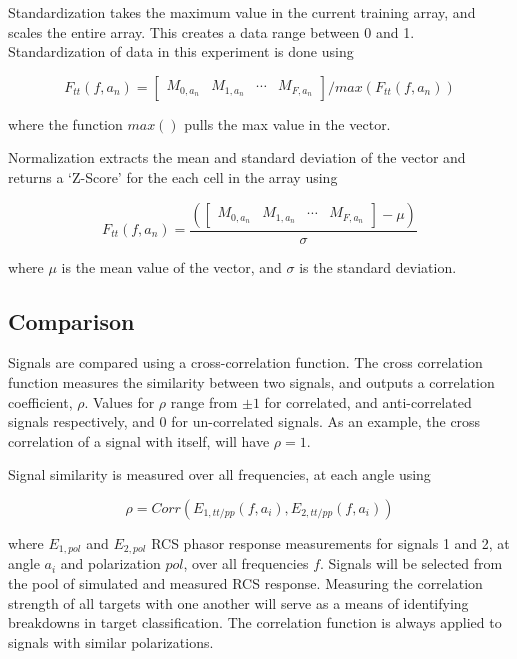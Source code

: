     Standardization takes the maximum value in the current training array, and scales the entire array. This creates a data range between 0 and 1. Standardization of data in this experiment is done using

    \begin{equation}\label{eq:F_stan}
      F_{tt}(f, a_n) =
       \begin{bmatrix}
         M_{0, a_n} & M_{1,a_n} & \cdots & M_{F,a_n}
       \end{bmatrix} / max(F_{tt}(f, a_n))
    \end{equation}

    where the function $max()$ pulls the max value in the vector.

    Normalization extracts the mean and standard deviation of the vector and returns a `Z-Score' for the each cell in the array using

    \begin{equation}\label{eq:F_z}
      F_{tt}(f, a_n) =
       \frac{\left(
       \begin{bmatrix}
         M_{0, a_n} & M_{1,a_n} & \cdots & M_{F,a_n}
       \end{bmatrix}
        - \mu \right)}{\sigma}
    \end{equation}

    where $\mu$ is the mean value of the vector, and $\sigma$ is the standard deviation.

  \subsection{Comparison}
  \label{sec:comparison}

    Signals are compared using a cross-correlation function. The cross correlation function measures the similarity between two signals, and outputs a correlation coefficient, $\rho$. Values for $\rho$ range from $\pm 1$ for correlated, and anti-correlated signals respectively, and $0$ for un-correlated signals. As an example, the cross correlation of a signal with itself, will have $\rho=1$.

    Signal similarity is measured over all frequencies, at each angle using

    \begin{equation}\label{eq:corr}
      \rho = Corr( E_{1, tt/pp}(f, a_i), E_{2, tt/pp}(f, a_i)  )
    \end{equation}

    where $E_{1, pol}$ and $E_{2, pol}$ RCS phasor response measurements for signals 1 and 2, at angle $a_i$ and polarization $pol$, over all frequencies $f$. Signals will be selected from the pool of simulated and measured RCS response. Measuring the correlation strength of all targets with one another will serve as a means of identifying breakdowns in target classification. The correlation function is always applied to signals with similar polarizations.

